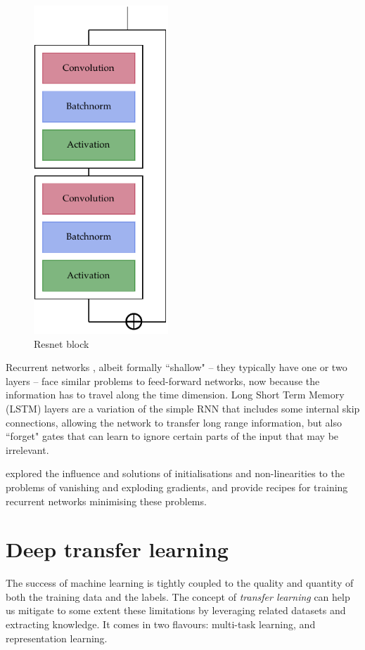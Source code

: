 \begin{figure}[tb]
	\centering
	\includegraphics[width=0.45\textwidth]{machine_learning/figures/resnet}
	\caption{Resnet block}\label{fig:resnet}
\end{figure}

Recurrent networks , albeit formally ``shallow" -- they typically have one or two layers -- face similar problems to feed-forward networks, now because the information has to travel along the time dimension.
Long Short Term Memory (LSTM) layers are a variation of the simple RNN that includes some internal skip connections, allowing the network to transfer long range information, but also ``forget" gates that can learn to ignore certain parts of the input that may be irrelevant.

\citet{difficult_recurrent} explored the influence and solutions of initialisations and non-linearities to the problems of vanishing and exploding gradients, and provide recipes for training recurrent networks minimising these problems.


\section{Deep transfer learning}
The success of machine learning is tightly coupled to the quality and quantity of both the training data and the labels.
The concept of \emph{transfer learning} can help us mitigate to some extent these limitations by leveraging related datasets and extracting knowledge.
It comes in two flavours: multi-task learning, and representation learning.

